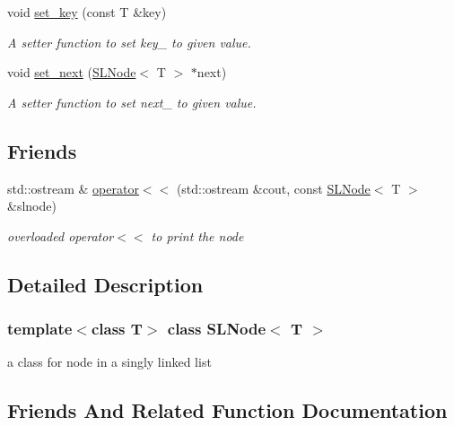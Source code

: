 \begin{DoxyCompactItemize}
void \mbox{\hyperlink{classSLNode_a8f8b8bdc7d6748ec3813e13bb2356d97}{set\+\_\+key}} (const T \&key)
\begin{DoxyCompactList}\small\item\em A setter function to set key\+\_\+ to given value. \end{DoxyCompactList}\item 
\mbox{\label{classSLNode_ad4534c39354156e5f27972911d685173}} 
void \mbox{\hyperlink{classSLNode_ad4534c39354156e5f27972911d685173}{set\+\_\+next}} (\mbox{\hyperlink{classSLNode}{S\+L\+Node}}$<$ T $>$ $\ast$next)
\begin{DoxyCompactList}\small\item\em A setter function to set next\+\_\+ to given value. \end{DoxyCompactList}\end{DoxyCompactItemize}
\subsection*{Friends}
\begin{DoxyCompactItemize}
\item 
std\+::ostream \& \mbox{\hyperlink{classSLNode_aa7f4c77a703c20065858ca9ea21f7caa}{operator$<$$<$}} (std\+::ostream \&cout, const \mbox{\hyperlink{classSLNode}{S\+L\+Node}}$<$ T $>$ \&slnode)
\begin{DoxyCompactList}\small\item\em overloaded operator$<$$<$ to print the node \end{DoxyCompactList}\end{DoxyCompactItemize}


\subsection{Detailed Description}
\subsubsection*{template$<$class T$>$\newline
class S\+L\+Node$<$ T $>$}

a class for node in a singly linked list 

\subsection{Friends And Related Function Documentation}
\mbox{\label{classSLNode_aa7f4c77a703c20065858ca9ea21f7caa}} 
